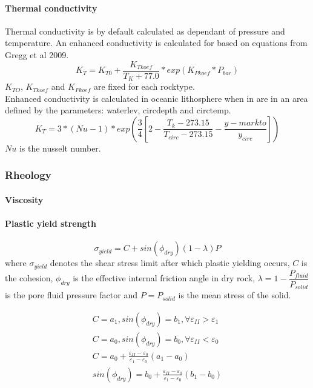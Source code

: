 \paragraph{ Thermal conductivity}
Thermal conductivity is by default calculated as dependant of pressure and temperature. An enhanced conductivity is calculated for  based on equations from Gregg et al 2009.\\
\begin{equation}
  K_T = K_{T0} + \frac{K_{Tkoef}}{T_K + 77.0}* exp( K_{Pkoef}*P_{bar} )
\end{equation}
$K_{TO}$, $K_{Tkoef}$ and $K_{Pkoef}$ are fixed for each rocktype. \\

Enhanced conductivity is calculated in oceanic lithosphere when in are in an area defined by the parameters: waterlev, circdepth and circtemp. 
\begin{equation}
 K_T = 3 *(Nu -1)* exp ( \frac{3}{4} [2-\frac{T_k-273.15}{T_{circ}-273.15} - \frac{y-markto}{y_{circ}} ] ) 
\end{equation}
$Nu$ is the nusselt number.

\subsubsection{Rheology}



\paragraph{Viscosity}
\paragraph{Plastic yield strength}
\begin{equation}\label{eqs:mohr_coulomb}
\sigma_{yield} = C + sin(\phi_{dry})(1-\lambda) P
\end{equation}
where $\sigma_{yield}$ denotes the shear stress limit after which plastic yielding occurs, $C$ is the cohesion, $\phi_{dry}$ is the effective internal friction angle in dry rock, $\lambda=1-\dfrac{P_{fluid}}{P_{solid}}$ is the pore fluid pressure factor and $P=P_{solid}$ is the mean stress of the solid.

\begin{equation}
\begin{split}
 C=a_1, sin(\phi_{dry})=b_1, \forall \varepsilon_{II} > \varepsilon_1 \\
 C=a_0, sin(\phi_{dry})=b_0, \forall \varepsilon_{II} < \varepsilon_0 \\
 C = a_0 + \frac{\varepsilon_{II} - \varepsilon_0}{\varepsilon_1 - \varepsilon_0} (a_1 -a_0) \\
 sin(\phi_{dry}) = b_0 + \frac{\varepsilon_{II} - \varepsilon_0}{\varepsilon_1 - \varepsilon_0} (b_1 -b_0)
 \end{split}
 \end{equation}

